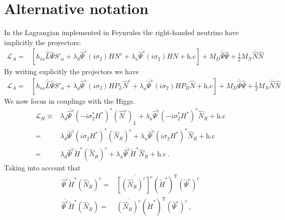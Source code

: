 \section{Alternative notation}
In the Lagrangian implemented in Feynrules the right-handed neutrino have implicitly the proyectors:
\begin{align}
    \mathcal{L}_A=&\left[ h_{i\alpha}\overline{\widehat{L}}\widehat{\Psi} S'_{\alpha}+\lambda_d \overline{\widehat{\Psi}^c}\left( i\sigma_2 \right) H {N}^{c}
+\lambda_u \overline{\widehat{\Psi}^c}\left( i\sigma_2 \right) H {N}+\text{h.c} \right]
+M_D\overline{\widehat{\Psi}}\widehat{\Psi}+\tfrac{1}{2}M_N\overline{\widehat{N}}\widehat{N}
\end{align}
By writing explicitly the projectors we have
\begin{align*}
    \mathcal{L}_A=&\left[ h_{i\alpha}\overline{\widehat{L}}\widehat{\Psi} S'_{\alpha}+\lambda_d \overline{\widehat{\Psi}^c}\left( i\sigma_2 \right) H P_L\widehat{N}^{c}
+\lambda_u \overline{\widehat{\Psi}^c}\left( i\sigma_2 \right) H P_R\widehat{N}+\text{h.c} \right]
+M_D\overline{\widehat{\Psi}}\widehat{\Psi}+\tfrac{1}{2}M_N\overline{\widehat{N}}\widehat{N}\
\end{align*}
We now focus in couplings with the Higgs. 
\begin{align}
 \mathcal{L}_{H} \equiv& \lambda_d \overline{\widehat{\Psi}^c}\left( -i\sigma_2^{*}  H^{*}\right)^{*} (\widehat{N}^{c})_L
+\lambda_u \overline{\widehat{\Psi}^c}\left( -i\sigma_2^{*}  H^{*}\right)^{*} \widehat{N}_R+\text{h.c} \nonumber\\
=&\lambda_d \overline{\widehat{\Psi}^c}\left( i\sigma_2  H^{*}\right)^{*} (\widehat{N}_R)^c
+\lambda_u \overline{\widehat{\Psi}^c}\left( i\sigma_2  H^{*}\right)^{*} \widehat{N}_R+\text{h.c}\nonumber\\
  =&\lambda_d \overline{\widehat{\Psi}^c} \widetilde{H}^{*} (\widehat{N}_R)^c
+\lambda_u \overline{\widehat{\Psi}^c}\widetilde{H}^{*}  \widehat{N}_R+\text{h.c}\,.
\end{align}
Taking into account that
\begin{align*}
  \overline{\widehat{\Psi}^c} \widetilde{H}^{*} (\widehat{N}_{R})^{c}=&\overline{\left[ (\widehat{N}_R)^c \right]^c} \left( \widetilde{H}^{*}  \right)^{\operatorname{T}}\left( \widehat{\Psi}^c \right)^c \nonumber\\
  \overline{\widehat{\Psi}^c} \widetilde{H}^{*} (\widehat{N}_{R})=&\overline{ (\widehat{N}_R)^c } \left( \widetilde{H}^{*}  \right)^{\operatorname{T}}\left( \widehat{\Psi}^c \right)^c \,,
\end{align*}
